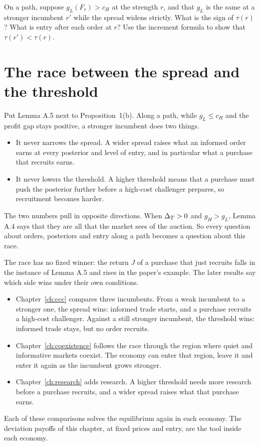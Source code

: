 \begin{checkyourself}\label{q:trading-negative}
On a path, suppose \(g_L(F_r)>c_H\) at the strength \(r\), and that \(g_L\) is the same at a stronger incumbent
\(r'\) while the spread widens strictly. What is the sign of \(\tau(r)\)? What is entry after each order at \(r\)?
Use the increment formula to show that \(\tau(r')<\tau(r)\).
\end{checkyourself}

\section{The race between the spread and the threshold}\label{sec:trading-race}

Put Lemma A.5 next to Proposition~1(b). Along a path, while \(g_L\le c_H\) and the profit gap stays positive, a
stronger incumbent does two things.
\begin{itemize}
\item It never narrows the spread. A wider spread raises what an informed order earns at every posterior and level
of entry, and in particular what a purchase that recruits earns.
\item It never lowers the threshold. A higher threshold means that a purchase must push the posterior further
before a high-cost challenger prepares, so recruitment becomes harder.
\end{itemize}
The two numbers pull in opposite directions. When \(\Delta_T>0\) and \(g_H>g_L\), Lemma A.4 says that they are all that
the market sees of the auction.
So every question about orders, posteriors and entry along a path becomes a question about this race.

The race has no fixed winner: the return \(J\) of a purchase that just recruits falls in the instance of
Lemma A.5 and rises in the paper's example. The later results say which side wins under their own conditions.
\begin{itemize}
\item Chapter~\ref{ch:ccc} compares three incumbents. From a weak incumbent to a stronger one, the spread wins:
informed trade starts, and a purchase recruits a high-cost challenger. Against a still stronger incumbent, the
threshold wins: informed trade stays, but no order recruits.
\item Chapter~\ref{ch:coexistence} follows the race through the region where quiet and informative markets coexist.
The economy can enter that region, leave it and enter it again as the incumbent grows stronger.
\item Chapter~\ref{ch:research} adds research. A higher threshold needs more research before a purchase recruits,
and a wider spread raises what that purchase earns.
\end{itemize}
Each of these comparisons solves the equilibrium again in each economy. The deviation payoffs of this chapter, at
fixed prices and entry, are the tool inside each economy.

